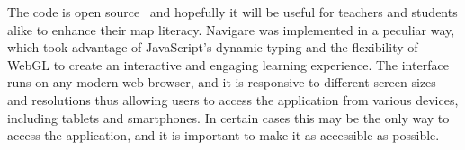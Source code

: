 \documentclass[conference]{IEEEtran}
\begin{document}
The code is open source~\cite{Navigare2026} and hopefully it will be useful for teachers and students alike to enhance their map literacy.
Navigare was implemented in a peculiar way, which took advantage of JavaScript's dynamic typing and the flexibility of WebGL
to create an interactive and engaging learning experience.
The interface runs on any modern web browser, and it is responsive to different screen sizes and resolutions
thus allowing users to access the application from various devices, including tablets and smartphones.
In certain cases this may be the only way to access the application, and it is important to make it as accessible as possible.

\newpage


\end{document}
